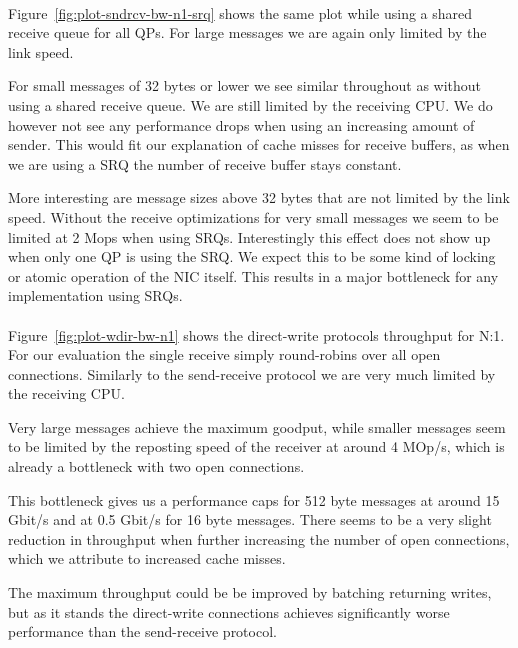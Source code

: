 \paragraph{} Figure~\ref{fig:plot-sndrcv-bw-n1-srq} shows the same plot while using a shared receive queue for all QPs. For
large messages we are again only limited by the link speed.

For small messages of 32 bytes or lower we see similar throughout as without using a shared receive queue. We are still
limited by the receiving CPU. We do however not see any performance drops when using an increasing amount of sender. This
would fit our explanation of cache misses for receive buffers, as when we are using a SRQ the number of receive buffer stays
constant.

More interesting are message sizes above 32 bytes that are not limited by the link speed. Without the receive optimizations 
for very small messages we seem to be limited at 2 Mops when using SRQs. Interestingly this effect does not show up when only
one QP is using the SRQ. We expect this to be some kind of locking or atomic operation of the NIC itself. This results in a
major bottleneck for any implementation using SRQs.

\paragraph{} Figure~\ref{fig:plot-wdir-bw-n1} shows the direct-write protocols throughput for N:1. For our evaluation the 
single receive simply round-robins over all open connections. Similarly to the send-receive protocol we are very much limited
by the receiving CPU.

Very large messages achieve the maximum goodput,  while smaller messages seem to be limited by the reposting speed of the 
receiver at around 4 MOp/s, which is already a bottleneck with two open connections.

This bottleneck gives us a performance caps for 512 byte messages at around 15 Gbit/s and at 0.5 Gbit/s for 16 byte messages.
There seems to be a very slight reduction in throughput when further increasing the number of open connections, which we 
attribute to increased cache misses.

The maximum throughput could be be improved by batching returning writes, but as it stands the direct-write connections
achieves significantly worse performance than the send-receive protocol.



